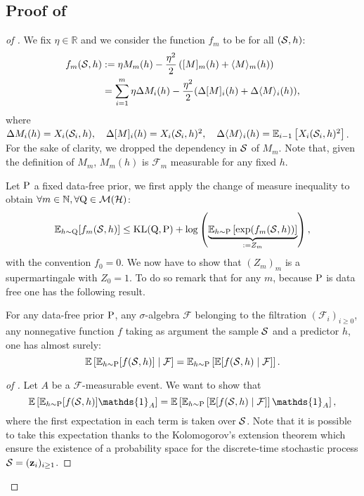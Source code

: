 \subsection{Proof of }
\label{sec: proof_main_thm}

\begin{proof}[of ]
We fix $\eta\in\mathbb{R}$ and we consider the function $f_m$ to be for all $(\S,h)$:
\begin{align*}
f_m(\S,h) & := \eta M_m(h) - \frac{\eta^2}{2} \left( [M]_m(h) + \langle M \rangle_m(h)   \right)\\
& = \sum_{i=1}^m \eta\Delta M_i(h)  - \frac{\eta^2}{2}(\Delta[M]_i(h) + \Delta \langle M\rangle_i(h)),
\end{align*}
where  $\Delta M_{i}(h)=X_i(\S_i,h), \quad\Delta[M]_{i}(h)=X_i(\S_i,h)^{2}, \quad\Delta\langle M\rangle_{i}(h)=\mathbb{E}_{i-1}\left[X_{i}(\S_i,h)^{2}\right]$.
For the sake of clarity, we dropped the dependency in $\S$ of $M_m$. Note that, given the definition of $M_m$, $M_m(h)$ is $\mathcal{F}_{m}$ measurable for any fixed $h$.

Let $\P$ a fixed data-free prior, we first apply the change of measure inequality to obtain $\forall m\in\mathbb{N},\forall \Q\in \mathcal{M}(\mathcal{H})$:
\[  \mathbb{E}_{h\sim \Q}[f_m(\S,h)] \leq \operatorname{KL}(\Q,\P) + \log\left(\underbrace{\mathbb{E}_{h\sim \P} \left[ \exp (f_m(\S,h))   \right] }_{:= Z_m} \right),   \]
with the convention $f_0= 0$.
We now have to show that $(Z_m)_m$ is a supermartingale with $Z_0=1$. To do so remark that for any $m$, because $\P$ is data free one has the following result.
\begin{lemma}
\label{l: cond_fubini}
For any data-free prior $\P$, any $\sigma$-algebra $\mathcal{F}$ belonging to the filtration $(\mathcal{F}_i)_{i\geq 0}$, any nonnegative function  $f$ taking as argument the sample $\S$ and a predictor $h$, one has almost surely: $$\mathbb{E}\left[\mathbb{E}_{h\sim \P}[f(\S,h)] \mid \mathcal{F}\right]  =  \mathbb{E}_{h\sim \P}\left[\mathbb{E}[f(\S,h) \mid \mathcal{F}] \right].$$
\end{lemma}
\begin{proof}[of ]
Let $A$ be a $\mathcal{F}$-measurable event. We want to show that
\[ \mathbb{E}\left[\mathbb{E}_{h\sim \P} [f(\S,h)]\mathds{1}_A \right] = \mathbb{E}\left[\mathbb{E}_{h\sim \P} \left[ \mathbb{E}[f(\S,h)\mid \mathcal{F}] \right] \mathds{1}_A \right], \]
where the first expectation in each term is taken over $\S$. Note that it is possible to take this expectation thanks to the Kolomogorov's extension theorem \citep[see \emph{e.g.}][Thm 2.4.4]{tao2011introduction} which ensure the existence of a probability space for the discrete-time stochastic process $\S=(\z_i)_{i\geq 1}$.


\end{proof}
\end{proof}
